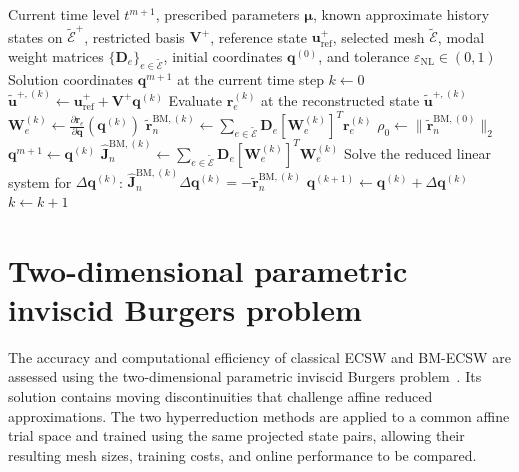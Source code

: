 \documentclass[a4paper,12pt]{article}
\newcommand{\vect}[1]{\boldsymbol{#1}}
\newcommand{\matr}[1]{\boldsymbol{#1}}
\begin{document}
\begin{algorithm}[H]
 \caption{Online solution of HPROM (BM-ECSW)}
 \label{alg:online}
 \small
 \begin{algorithmic}[1]
  \setlength{\itemsep}{2pt}
  \Require Current time level $t^{m+1}$, prescribed parameters $\vect{\mu}$, known approximate history states on $\widetilde{\mathcal E}^{+}$, restricted basis $\matr{V}^+$, reference state $\vect{u}_{\mathrm{ref}}^+$, selected mesh $\widetilde{\mathcal E}$, modal weight matrices $\{\matr{D}_e\}_{e\in\widetilde{\mathcal E}}$, initial coordinates $\vect{q}^{(0)}$, and tolerance $\varepsilon_{\mathrm{NL}}\in(0,1)$
  \Ensure Solution coordinates $\vect{q}^{m+1}$ at the current time step
  \State $k\gets0$
  \Loop
   \State $\widetilde{\vect{u}}^{+,(k)}\gets\vect{u}_{\mathrm{ref}}^++\matr{V}^+\vect{q}^{(k)}$
    \State Evaluate $\vect{r}_e^{(k)}$ at the reconstructed state $\widetilde{\vect{u}}^{+,(k)}$
    \State $\matr{W}_e^{(k)}\gets\displaystyle\frac{\partial\vect{r}_e}{\partial\vect{q}}(\vect{q}^{(k)})$
   \EndFor
   \State $\widetilde{\vect{r}}_n^{\mathrm{BM},(k)}\gets
      \sum_{e\in\widetilde{\mathcal E}}\matr{D}_e[\matr{W}_e^{(k)}]^T\vect{r}_e^{(k)}$
    \State $\rho_0\gets\|\widetilde{\vect{r}}_n^{\mathrm{BM},(0)}\|_2$
   \EndIf
   \If{$\|\widetilde{\vect{r}}_n^{\mathrm{BM},(k)}\|_2\leq\varepsilon_{\mathrm{NL}}\rho_0$}
    \State \Return $\vect{q}^{m+1}\gets\vect{q}^{(k)}$
   \EndIf
   \State $\widehat{\matr{J}}_n^{\mathrm{BM},(k)}\gets
      \sum_{e\in\widetilde{\mathcal E}}\matr{D}_e[\matr{W}_e^{(k)}]^T\matr{W}_e^{(k)}$
   \State Solve the reduced linear system for $\Delta\vect{q}^{(k)}$:
   \Statex \hspace{\algorithmicindent}$\displaystyle
      \widehat{\matr{J}}_n^{\mathrm{BM},(k)}\Delta\vect{q}^{(k)}
      =-\widetilde{\vect{r}}_n^{\mathrm{BM},(k)}$
   \State $\vect{q}^{(k+1)}\gets\vect{q}^{(k)}+\Delta\vect{q}^{(k)}$
   \State $k\gets k+1$
  \EndLoop
 \end{algorithmic}
\end{algorithm}


\section{Two-dimensional parametric inviscid Burgers problem}
\label{sec:burgers}

The accuracy and computational efficiency of classical ECSW and BM-ECSW are assessed using the two-dimensional parametric inviscid Burgers problem~\cite{barnett2023neural,ares2026closure}. Its solution contains moving discontinuities that challenge affine reduced approximations. The two hyperreduction methods are applied to a common affine trial space and trained using the same projected state pairs, allowing their resulting mesh sizes, training costs, and online performance to be compared.
\end{document}
